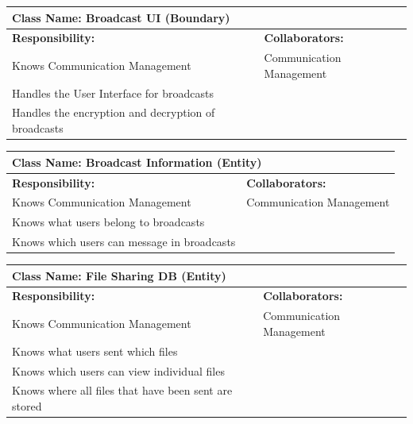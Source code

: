 \documentclass[]{article}
\begin{document}
\begin{table}[ht]
	\centering
	\begin{tabular}{|p{7cm}|p{7cm}|}
		\hline
		\multicolumn{2}{|l|}{\textbf{Class Name:} Broadcast UI (Boundary)}             \\
		\hline
		\textbf{Responsibility:}                            & \textbf{Collaborators:}  \\
		\hline
		Knows Communication Management                      & Communication Management \\
		Handles the User Interface for broadcasts           &                          \\
		Handles the encryption and decryption of broadcasts &                          \\
		\hline
	\end{tabular}
\end{table}

\begin{table}[ht]
	\centering
	\begin{tabular}{|p{7cm}|p{7cm}|}
		\hline
		\multicolumn{2}{|l|}{\textbf{Class Name:} Broadcast Information (Entity)} \\
		\hline
		\textbf{Responsibility:}                    & \textbf{Collaborators:}     \\
		\hline
		Knows Communication Management              & Communication Management    \\
		Knows what users belong to broadcasts       &                             \\
		Knows which users can message in broadcasts &                             \\
		\hline
	\end{tabular}
\end{table}

\begin{table}[ht]
	\centering
	\begin{tabular}{|p{7cm}|p{7cm}|}
		\hline
		\multicolumn{2}{|l|}{\textbf{Class Name:} File Sharing DB (Entity)}             \\
		\hline
		\textbf{Responsibility:}                             & \textbf{Collaborators:}  \\
		\hline
		Knows Communication Management                       & Communication Management \\
		Knows what users sent which files                    &                          \\
		Knows which users can view individual files          &                          \\
		Knows where all files that have been sent are stored &                          \\
		\hline
	\end{tabular}
\end{table}
\end{document}
